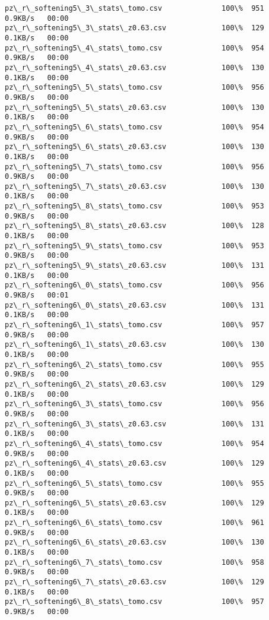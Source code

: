 \documentclass[11pt]{article}
\begin{document}
\begin{Verbatim}[commandchars=\\\{\}]
pz\_r\_softening5\_3\_stats\_tomo.csv              100\%  951     0.9KB/s   00:00    
pz\_r\_softening5\_3\_stats\_z0.63.csv             100\%  129     0.1KB/s   00:00    
pz\_r\_softening5\_4\_stats\_tomo.csv              100\%  954     0.9KB/s   00:00    
pz\_r\_softening5\_4\_stats\_z0.63.csv             100\%  130     0.1KB/s   00:00    
pz\_r\_softening5\_5\_stats\_tomo.csv              100\%  956     0.9KB/s   00:00    
pz\_r\_softening5\_5\_stats\_z0.63.csv             100\%  130     0.1KB/s   00:00    
pz\_r\_softening5\_6\_stats\_tomo.csv              100\%  954     0.9KB/s   00:00    
pz\_r\_softening5\_6\_stats\_z0.63.csv             100\%  130     0.1KB/s   00:00    
pz\_r\_softening5\_7\_stats\_tomo.csv              100\%  956     0.9KB/s   00:00    
pz\_r\_softening5\_7\_stats\_z0.63.csv             100\%  130     0.1KB/s   00:00    
pz\_r\_softening5\_8\_stats\_tomo.csv              100\%  953     0.9KB/s   00:00    
pz\_r\_softening5\_8\_stats\_z0.63.csv             100\%  128     0.1KB/s   00:00    
pz\_r\_softening5\_9\_stats\_tomo.csv              100\%  953     0.9KB/s   00:00    
pz\_r\_softening5\_9\_stats\_z0.63.csv             100\%  131     0.1KB/s   00:00    
pz\_r\_softening6\_0\_stats\_tomo.csv              100\%  956     0.9KB/s   00:01    
pz\_r\_softening6\_0\_stats\_z0.63.csv             100\%  131     0.1KB/s   00:00    
pz\_r\_softening6\_1\_stats\_tomo.csv              100\%  957     0.9KB/s   00:00    
pz\_r\_softening6\_1\_stats\_z0.63.csv             100\%  130     0.1KB/s   00:00    
pz\_r\_softening6\_2\_stats\_tomo.csv              100\%  955     0.9KB/s   00:00    
pz\_r\_softening6\_2\_stats\_z0.63.csv             100\%  129     0.1KB/s   00:00    
pz\_r\_softening6\_3\_stats\_tomo.csv              100\%  956     0.9KB/s   00:00    
pz\_r\_softening6\_3\_stats\_z0.63.csv             100\%  131     0.1KB/s   00:00    
pz\_r\_softening6\_4\_stats\_tomo.csv              100\%  954     0.9KB/s   00:00    
pz\_r\_softening6\_4\_stats\_z0.63.csv             100\%  129     0.1KB/s   00:00    
pz\_r\_softening6\_5\_stats\_tomo.csv              100\%  955     0.9KB/s   00:00    
pz\_r\_softening6\_5\_stats\_z0.63.csv             100\%  129     0.1KB/s   00:00    
pz\_r\_softening6\_6\_stats\_tomo.csv              100\%  961     0.9KB/s   00:00    
pz\_r\_softening6\_6\_stats\_z0.63.csv             100\%  130     0.1KB/s   00:00    
pz\_r\_softening6\_7\_stats\_tomo.csv              100\%  958     0.9KB/s   00:00    
pz\_r\_softening6\_7\_stats\_z0.63.csv             100\%  129     0.1KB/s   00:00    
pz\_r\_softening6\_8\_stats\_tomo.csv              100\%  957     0.9KB/s   00:00    

\end{Verbatim}
\end{document}
